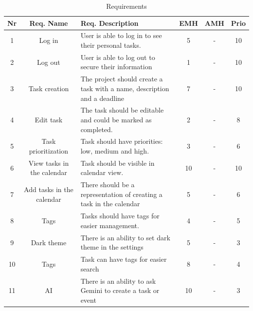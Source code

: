 \documentclass{article}
\begin{document}
\begin{table}[h]
  \centering
  \begin{tabularx}{\textwidth}{|c|c|X|c|c|c|}
    \toprule
    \textbf{Nr} & \textbf{Req. Name}         & \textbf{Req. Description}                                                & \textbf{EMH} & \textbf{AMH} & \textbf{Prio} \\
    \hline
    1           & Log in                     & User is able to log in to see their personal tasks.                      & 5            & -            & 10            \\    \hline
    2           & Log out                    & User is able to log out to secure their information                      & 1            & -            & 10            \\    \hline
    3           & Task creation              & The project should create a task with a name, description and a deadline & 7            & -            & 10            \\
    \hline
    4           & Edit task                  & The task should be editable and could be marked as completed.            & 2            & -            & 8             \\
    \hline
    5           & Task prioritization        & Task should have priorities: low, medium and high.                       & 3            & -            & 6             \\
    \hline
    6           & View tasks in the calendar & Task should be visible in calendar view.                                 & 10           & -            & 10            \\
    \hline
    7           & Add tasks in the calendar  & There should be a representation of creating a task in the calendar      & 5            & -            & 6             \\
    \hline
    8           & Tags                       & Tasks should have tags for easier management.                            & 4            & -            & 5             \\
    \hline

    9           & Dark theme                 & There is an ability to set dark theme in the settings                    & 5            & -            & 3             \\    \hline
    10          & Tags                       & Task can have tags for easier search                                     & 8            & -            & 4             \\\hline
    11          & AI                         & There is an ability to ask Gemini to create a task or event              & 10           & -            & 3             \\

    \bottomrule
  \end{tabularx}
  \caption{Requirements}
  \label{Requirements with EMH, AMH, and priority}
\end{table}
\end{document}
